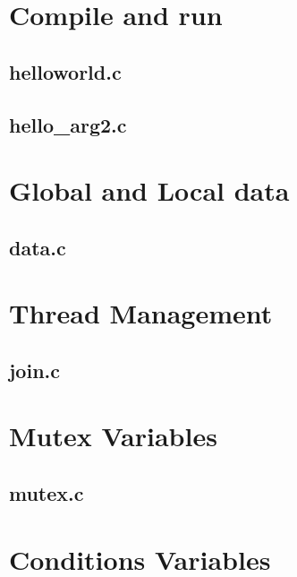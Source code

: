 \chapter{Compile and run}

\section{helloworld.c}



\section{hello\_arg2.c}



\chapter{Global and Local data}

\section{data.c}



\chapter{Thread Management}

\section{join.c}



\chapter{Mutex Variables}

\section{mutex.c}
  


\chapter{Conditions Variables}

